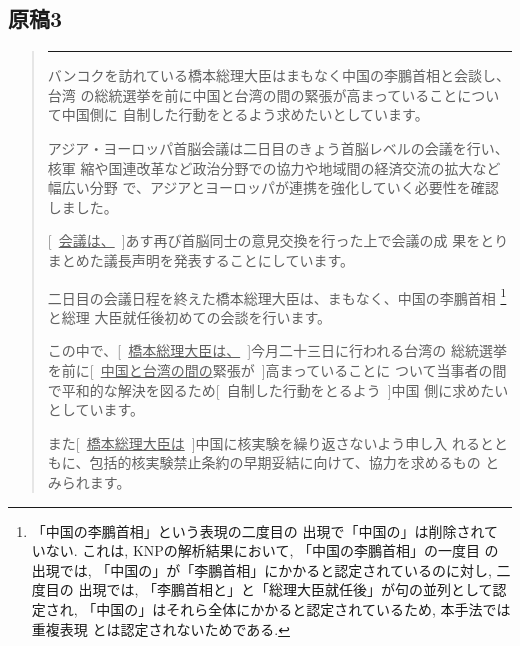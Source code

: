 \subsection*{原稿3}
\begin{quotation}
\hrule

 バンコクを訪れている橋本総理大臣はまもなく中国の李鵬首相と会談し、台湾
 の総統選挙を前に中国と台湾の間の緊張が高まっていることについて中国側に
 自制した行動をとるよう求めたいとしています。

 アジア・ヨーロッパ首脳会議は二日目のきょう首脳レベルの会議を行い、核軍
 縮や国連改革など政治分野での協力や地域間の経済交流の拡大など幅広い分野
 で、アジアとヨーロッパが連携を強化していく必要性を確認しました。

 [~\underline{会議は、}~]あす再び首脳同士の意見交換を行った上で会議の成
 果をとりまとめた議長声明を発表することにしています。

 二日目の会議日程を終えた橋本総理大臣は、まもなく、中国の李鵬首相
\footnote{「中国の李鵬首相」という表現の二度目の
出現で「中国の」は削除されていない. これは, 
KNPの解析結果において, 「中国の李鵬首相」の一度目
の出現では, 「中国の」が「李鵬首相」にかかると認定されているのに対し, 二度目の
出現では, 「李鵬首相と」と「総理大臣就任後」が句の並列として認定され, 
「中国の」はそれら全体にかかると認定されているため, 本手法では重複表現
とは認定されないためである. }と総理
 大臣就任後初めての会談を行います。

 この中で、[~\underline{橋本総理大臣は、}~]今月二十三日に行われる台湾の
 総統選挙を前に[~\underline{中国と台湾の間の}緊張が~]高まっていることに
 ついて当事者の間で平和的な解決を図るため[~自制した行動をとるよう~]中国
 側に求めたいとしています。

 また[~\underline{橋本総理大臣は}~]中国に核実験を繰り返さないよう申し入
 れるとともに、包括的核実験禁止条約の早期妥結に向けて、協力を求めるもの
 とみられます。
\end{quotation}


